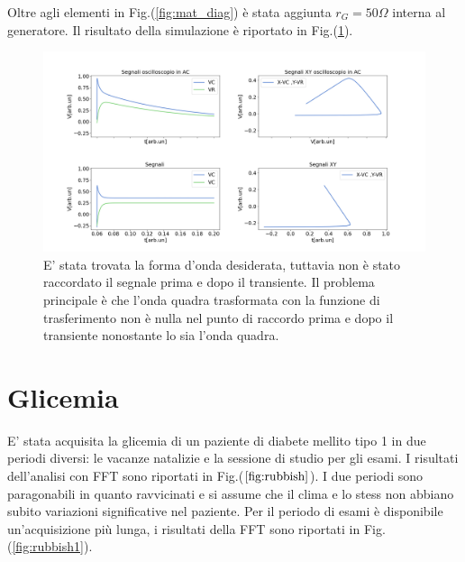 \documentclass{article}
\begin{document}
    Oltre agli elementi in Fig.(\ref{fig:mat_diag}) è stata aggiunta $r_{G} = 50 \Omega$ interna al generatore.
    Il risultato della simulazione è riportato in Fig.(\ref{fig:pinnacolone}).

    \begin{figure}[H]
        \centering
        \includegraphics[width=\textwidth]{FFT13/pinnacolone.png}
        \caption{E' stata trovata la forma d'onda desiderata, tuttavia non è stato raccordato il segnale prima 
            e dopo il transiente. Il problema principale è che l'onda quadra trasformata con la funzione di 
            trasferimento non è nulla nel punto di raccordo prima e dopo il transiente
            nonostante lo sia l'onda quadra.}
        \label{fig:pinnacolone}
    \end{figure} 


\section{Glicemia}

        E' stata acquisita la glicemia di un paziente di diabete mellito tipo 1 in 
        due periodi diversi: le vacanze natalizie e la sessione di studio per gli esami.
        I risultati dell'analisi con FFT sono riportati in Fig.($\ref{fig:rubbish}$).
        I due periodi sono paragonabili in quanto ravvicinati e si assume che
        il clima e lo stess non abbiano subito variazioni significative 
        nel paziente.
        Per il periodo di esami  è disponibile un'acquisizione più lunga, i risultati
        della FFT sono  riportati in Fig.(\ref{fig:rubbish1}).
        
\end{document}
